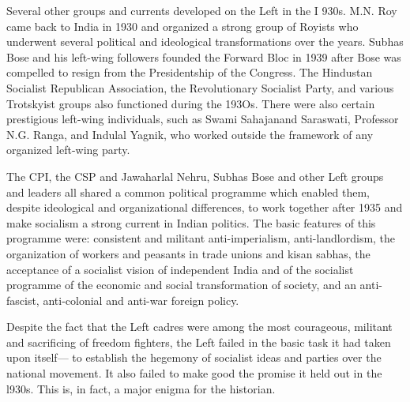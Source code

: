 Several other groups and currents developed on the Left in the I 930s. M.N. Roy came back to India in 1930 and organized a strong group of Royists who underwent several political and ideological transformations over the years. Subhas Bose and his left-wing followers founded the Forward Bloc in 1939 after Bose was compelled to resign from the Presidentship of the Congress. The Hindustan Socialist Republican Association, the Revolutionary Socialist Party, and various Trotskyist groups also functioned during the 193Os. There were also certain prestigious left-wing individuals, such as Swami Sahajanand Saraswati, Professor N.G. Ranga, and Indulal Yagnik, who worked outside the framework of any organized left-wing party. 

The CPI, the CSP and Jawaharlal Nehru, Subhas Bose and other Left groups and leaders all shared a common political programme which enabled them, despite ideological and organizational differences, to work together after 1935 and make socialism a strong current in Indian politics. The basic features of this programme were: consistent and militant anti-imperialism, anti-landlordism, the organization of workers and peasants in trade unions and kisan sabhas, the acceptance of a socialist vision of independent India and of the socialist programme of the economic and social transformation of society, and an anti-fascist, anti-colonial and anti-war foreign policy. 

Despite the fact that the Left cadres were among the most courageous, militant and sacrificing of freedom fighters, the Left failed in the basic task it had taken upon itself— to establish the hegemony of socialist ideas and parties over the national movement. It also failed to make good the promise it held out in the l930s. This is, in fact, a major enigma for the historian. 


